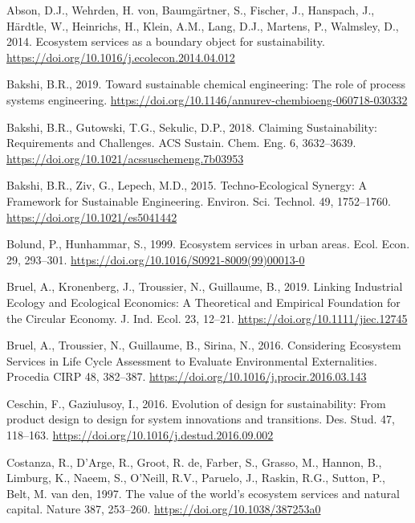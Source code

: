 \documentclass[]{elsarticle} %
\newlength{\cslhangindent}
\newenvironment{CSLReferences}[2] %
 {%
  \setlength{\parindent}{0pt}
  \ifodd #1 \everypar{\setlength{\hangindent}{\cslhangindent}}\ignorespaces\fi
  \ifnum #2 > 0
  \setlength{\parskip}{#2\baselineskip}
  \fi
 }%
 {}
\begin{document}
\hypertarget{refs}{}
\begin{CSLReferences}{1}{0}
\leavevmode{}%
Abson, D.J., Wehrden, H. von, Baumgärtner, S., Fischer, J., Hanspach, J., Härdtle, W., Heinrichs, H., Klein, A.M., Lang, D.J., Martens, P., Walmsley, D., 2014. {Ecosystem services as a boundary object for sustainability}. \url{https://doi.org/10.1016/j.ecolecon.2014.04.012}

\leavevmode{}%
Bakshi, B.R., 2019. {Toward sustainable chemical engineering: The role of process systems engineering}. \url{https://doi.org/10.1146/annurev-chembioeng-060718-030332}

\leavevmode{}%
Bakshi, B.R., Gutowski, T.G., Sekulic, D.P., 2018. {Claiming Sustainability: Requirements and Challenges}. ACS Sustain. Chem. Eng. 6, 3632--3639. \url{https://doi.org/10.1021/acssuschemeng.7b03953}

\leavevmode{}%
Bakshi, B.R., Ziv, G., Lepech, M.D., 2015. {Techno-Ecological Synergy: A Framework for Sustainable Engineering}. Environ. Sci. Technol. 49, 1752--1760. \url{https://doi.org/10.1021/es5041442}

\leavevmode{}%
Bolund, P., Hunhammar, S., 1999. {Ecosystem services in urban areas}. Ecol. Econ. 29, 293--301. \url{https://doi.org/10.1016/S0921-8009(99)00013-0}

\leavevmode{}%
Bruel, A., Kronenberg, J., Troussier, N., Guillaume, B., 2019. {Linking Industrial Ecology and Ecological Economics: A Theoretical and Empirical Foundation for the Circular Economy}. J. Ind. Ecol. 23, 12--21. \url{https://doi.org/10.1111/jiec.12745}

\leavevmode{}%
Bruel, A., Troussier, N., Guillaume, B., Sirina, N., 2016. {Considering Ecosystem Services in Life Cycle Assessment to Evaluate Environmental Externalities}. Procedia CIRP 48, 382--387. \url{https://doi.org/10.1016/j.procir.2016.03.143}

\leavevmode{}%
Ceschin, F., Gaziulusoy, I., 2016. {Evolution of design for sustainability: From product design to design for system innovations and transitions}. Des. Stud. 47, 118--163. \url{https://doi.org/10.1016/j.destud.2016.09.002}

\leavevmode{}%
Costanza, R., D'Arge, R., Groot, R. de, Farber, S., Grasso, M., Hannon, B., Limburg, K., Naeem, S., O'Neill, R.V., Paruelo, J., Raskin, R.G., Sutton, P., Belt, M. van den, 1997. {The value of the world's ecosystem services and natural capital}. Nature 387, 253--260. \url{https://doi.org/10.1038/387253a0}


\end{CSLReferences}
\end{document}
